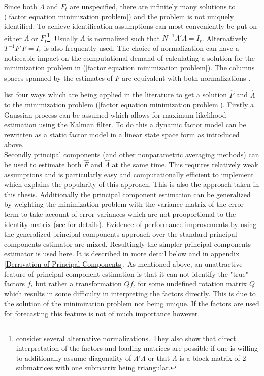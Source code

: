 \documentclass[12pt]{article}
\begin{document}
Since both $\Lambda$ and $F_t$ are unspecified, there are infinitely many solutions to (\ref{factor equation minimization problem}) and the problem is not uniquely identified. To achieve identification assumptions can most conveniently be put on either $\Lambda$ or $F_t$\footnote{\citet{bai2013principal} consider several alternative normalizations. They also show that direct interpretation of the factors and loading matrices are possible if one is willing to additionally assume diagonality of $\Lambda'\Lambda$ or that $\Lambda$ is a block matrix of 2 submatrices with one submatrix being triangular.}. Usually $\Lambda$ is normalized such that $N^{-1} \Lambda'\Lambda = I_r$. Alternatively $T^{-1}F'F = I_r$ is also frequently used. The choice of normalization can have a noticeable impact on the computational demand of calculating a solution for the minimization problem in (\ref{factor equation minimization problem}). The columns spaces spanned by the estimates of $F$ are equivalent with both normalizations \citep{stock2011dynamic}.

\citet{stock2011dynamic} list four ways which are being applied in the literature to get a solution $\hat F$ and $\hat \Lambda$ to the minimization problem (\ref{factor equation minimization problem}). Firstly a Gaussian process can be assumed which allows for maximum likelihood estimation using the Kalman filter. To do this a dynamic factor model can be rewritten as a static factor model in a linear state space form as introduced above. \\
Secondly principal components (and other nonparametric averaging methods) can be used to estimate both $\hat F$ and $\hat \Lambda$ at the same time. This requires relatively weak assumptions and is particularly easy and computationally efficient to implement which explains the popularity of this approach. This is also the approach taken in this thesis. Additionally the principal component estimation can be generalized by weighting the minimization problem with the variance matrix of the error term to take account of error variances which are not prooportional to the identity matrix (see \citet{stock2011dynamic} for details). Evidence of performance improvements by using the generalized principal components approach over the standard principal components estimator are mixed. Resultingly the simpler principal components estimator is used here. It is described in more detail below and in appendix \ref{Derrivation of Principal Components}. As mentioned above, an unattractive feature of principal component estimation is that it can not identify the "true" factors $f_t$ but rather a transformation $Q f_t$ for some undefined rotation matrix $Q$ which results in some difficulty in interpreting the factors directly. This is due to the solution of the minimization problem not being unique. If the factors are used for forecasting this feature is not of much importance however.
\end{document}
